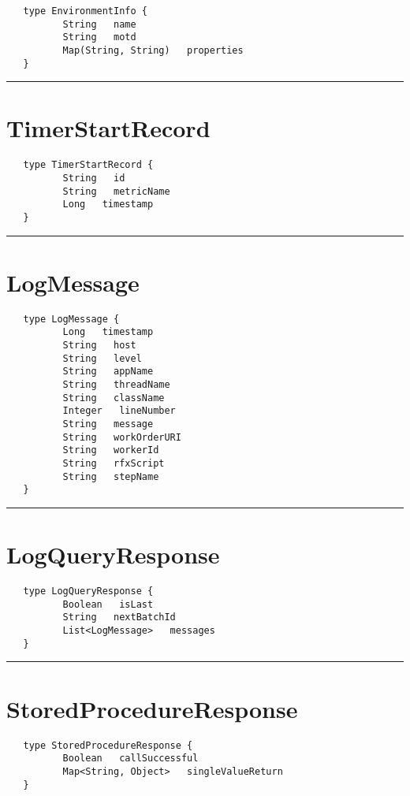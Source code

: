 \begin{verbatim}
   type EnvironmentInfo {
          String   name
          String   motd
          Map(String, String)   properties
   }
\end{verbatim}

\rule{15cm}{2pt}
\section{TimerStartRecord}
\label{type:TimerStartRecord}

\begin{verbatim}
   type TimerStartRecord {
          String   id
          String   metricName
          Long   timestamp
   }
\end{verbatim}

\rule{15cm}{2pt}
\section{LogMessage}
\label{type:LogMessage}

\begin{verbatim}
   type LogMessage {
          Long   timestamp
          String   host
          String   level
          String   appName
          String   threadName
          String   className
          Integer   lineNumber
          String   message
          String   workOrderURI
          String   workerId
          String   rfxScript
          String   stepName
   }
\end{verbatim}

\rule{15cm}{2pt}
\section{LogQueryResponse}
\label{type:LogQueryResponse}

\begin{verbatim}
   type LogQueryResponse {
          Boolean   isLast
          String   nextBatchId
          List<LogMessage>   messages
   }
\end{verbatim}

\rule{15cm}{2pt}
\section{StoredProcedureResponse}
\label{type:StoredProcedureResponse}

\begin{verbatim}
   type StoredProcedureResponse {
          Boolean   callSuccessful
          Map<String, Object>   singleValueReturn
   }
\end{verbatim}

